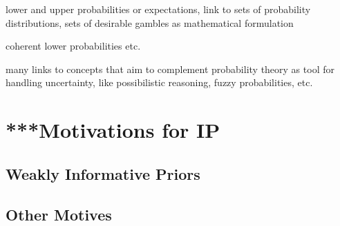 lower and upper probabilities or expectations,
link to sets of probability distributions,
sets of desirable gambles as mathematical formulation

coherent lower probabilities etc.


many links to concepts that aim to complement probability theory as tool for handling uncertainty,
like possibilistic reasoning, fuzzy probabilities, etc.


\section{***Motivations for IP}

\subsection{\pdc }

\subsection{Weakly Informative Priors}


\subsection{Other Motives}

